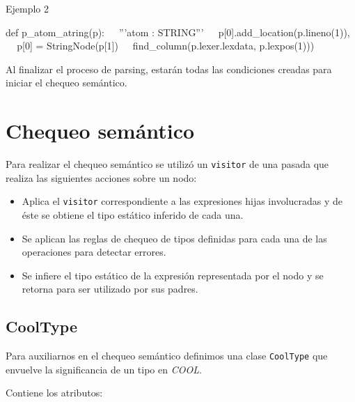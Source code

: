 \documentclass[a4paper,10pt,twocolumn]{article}
\begin{document}
\begin{algorithm}
	\caption{Ejemplo 2}
	\begin{algorithmic}
		\STATE def p\_atom\_atring(p):
		\STATE $\;\;\; $ '''atom : STRING'''
		\STATE $\;\;\; $ p[0].add\_location(p.lineno(1)),
		\STATE $\;\;\; $ p[0] = StringNode(p[1])
		\STATE $\;\;\; $ find\_column(p.lexer.lexdata, p.lexpos(1)))
	\end{algorithmic}
\end{algorithm}

Al finalizar el proceso de parsing, estarán todas las condiciones creadas para iniciar el chequeo semántico.

\section{Chequeo semántico}

Para realizar el chequeo semántico se utilizó un \lstinline|visitor| de una pasada que realiza las siguientes acciones sobre un nodo:

\begin{itemize}
	\item Aplica el \lstinline|visitor| correspondiente a las expresiones hijas involucradas y de éste se obtiene el tipo estático inferido de cada una. 
	\item Se aplican las reglas de chequeo de tipos definidas para cada una de las operaciones para detectar errores. 
	\item Se infiere el tipo estático de la expresión representada por el nodo y se retorna para ser utilizado por sus padres. 
\end{itemize}

\subsection{CoolType}
Para auxiliarnos en el chequeo semántico definimos una clase \lstinline|CoolType| que envuelve la significancia de un tipo en \textit{COOL}. 

Contiene los atributos:
\end{document}
